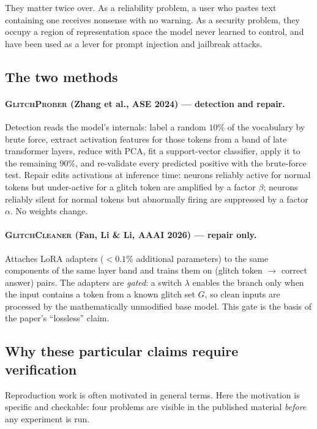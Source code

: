 \documentclass[11pt,a4paper]{article}
\newcommand{\gp}{\textsc{GlitchProber}}
\newcommand{\gc}{\textsc{GlitchCleaner}}
\begin{document}
They matter twice over. As a reliability problem, a user who pastes text
containing one receives nonsense with no warning. As a security problem, they
occupy a region of representation space the model never learned to control, and
have been used as a lever for prompt injection and jailbreak attacks.

\subsection{The two methods}

\paragraph{\gp{} (Zhang et al., ASE 2024) --- detection and repair.}
Detection reads the model's internals: label a random $10\%$ of the vocabulary by
brute force, extract activation features for those tokens from a band of late
transformer layers, reduce with PCA, fit a support-vector classifier, apply it to
the remaining $90\%$, and re-validate every predicted positive with the brute-force
test. Repair edits activations at inference time: neurons reliably active for
normal tokens but under-active for a glitch token are amplified by a factor
$\beta$; neurons reliably silent for normal tokens but abnormally firing are
suppressed by a factor $\alpha$. No weights change.

\paragraph{\gc{} (Fan, Li \& Li, AAAI 2026) --- repair only.}
Attaches LoRA adapters ($<0.1\%$ additional parameters) to the same components of
the same layer band and trains them on (glitch token $\rightarrow$ correct answer)
pairs. The adapters are \emph{gated}: a switch $\lambda$ enables the branch only
when the input contains a token from a known glitch set $G$, so clean inputs are
processed by the mathematically unmodified base model. This gate is the basis of
the paper's ``lossless'' claim.

\subsection{Why these particular claims require verification}
\label{sec:why}

Reproduction work is often motivated in general terms. Here the motivation is
specific and checkable: four problems are visible in the published material
\emph{before} any experiment is run.
\end{document}
